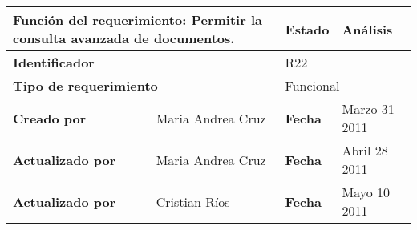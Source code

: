%
\begin{center}
\begin{longtable}{|p{}|p{}|p{}|p{}|}
\hline
\multicolumn{2}{|p{0.45\textwidth}|}{{\bf {Función del requerimiento:}}
Permitir la consulta avanzada de documentos. } & {\bf{ Estado}} & Análisis \\
\hline
\multicolumn{2}{|p{0.45\textwidth}}{\bf Identificador} &
\multicolumn{2}{|p{0.45\textwidth}|}{R22} \\
\hline
\multicolumn{2}{|p{0.45\textwidth}}{\bf {Tipo de requerimiento}} &
\multicolumn{2}{|p{0.45\textwidth}|}{Funcional}\\
\hline
\bf {Creado por} & Maria Andrea Cruz & \bf {Fecha  } & Marzo 31 2011\\
\hline
\bf {Actualizado por} & Maria Andrea Cruz  & \bf {Fecha  }& Abril 28 2011\\
\hline
\bf {Actualizado por} & Cristian Ríos  & \bf {Fecha  }& Mayo 10 2011\\


\end{longtable}
\end{center}
